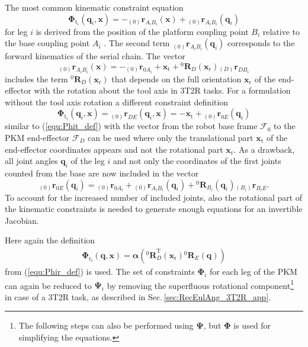 \documentclass[twocolumn,10pt]{IFTOMM}
\newcommand{\bm}[1]{\boldsymbol{#1}}
\newcommand{\ortvek}[4]{{ }_{(#1)}{\boldsymbol{#2}}^{#3}_{#4} }
\newcommand{\rotmat}[2]{{{ }^{#1}\boldsymbol{R}}_{#2}}
\newcommand{\transp}[0]{{\mathrm{T}}}
\newcommand{\ks}[1]{{\mathcal{F}}_{#1}}
\begin{document}
The most common kinematic constraint equation 
%
\begin{equation}
\bm{\Phi}_{\mathrm{t}_i}(\bm{q}_i,\bm{x}) = - \ortvek{0}{r}{}{A_iB_i}(\bm{x}) + \ortvek{0}{r}{}{A_iB_i}(\bm{q}_i) 
\end{equation}
%
for leg $i$ is derived from the position of the platform coupling point $B_i$ relative to the base coupling point $A_i$ \cite{Merlet2006}.
The second term $\ortvek{0}{r}{}{A_iB_i}(\bm{q}_i)$ corresponds to the forward kinematics of the serial chain. 
The vector
\begin{equation}
\ortvek{0}{r}{}{A_iB_i}(\bm{x}) = 
- \ortvek{0}{r}{}{0A_i}
+ \bm{x}_{\mathrm{t}} + \rotmat{0}{D}(\bm{x}_{\mathrm{r}}) \ortvek{D}{r}{}{DB_i}
\end{equation}
%
includes the term $\rotmat{0}{D}(\bm{x}_{\mathrm{r}})$ that depends on the full  orientation $\bm{x}_{\mathrm{r}}$ of the end-effector with the rotation about the tool axis in 3T2R tasks.
For a formulation without the tool axis rotation a different constraint definition
%
\begin{equation}
\bm{\Phi}_{\mathrm{t}_i}(\bm{q}_i,\bm{x}) = 
\ortvek{0}{r}{}{DE}(\bm{q}_i,\bm{x}) =
- \bm{x}_{\mathrm{t}} + \ortvek{0}{r}{}{0E}(\bm{q}_i) 
\end{equation}
%
similar to (\ref{equ:Phit_def}) with the vector from the robot base frame $\ks{0}$ to the PKM end-effector $\ks{D}$ can be used where 
only the translational part $\bm{x}_{\mathrm{t}}$ of the end-effector coordinates appears and not the rotational part $\bm{x}_{\mathrm{r}}$.
As a drawback, all joint angles $\bm{q}_i$ of the leg $i$ and not only the coordinates of the first joints counted from the base are now included
in the vector
%
\begin{equation}
\ortvek{0}{r}{}{0E}(\bm{q}_i) = 
\ortvek{0}{r}{}{0A_i}
+ \ortvek{0}{r}{}{A_iB_i}(\bm{q}_i) + \rotmat{0}{B_i}(\bm{q}_i) \ortvek{B_i}{r}{}{B_iE}.
\end{equation}
%
To account for the increased number of included joints, also the rotational part of the kinematic constraints is needed to generate enough equations for an invertible Jacobian.

Here again the definition 
%
\begin{align}
\bm{\Phi}_{\mathrm{r}_i}(\bm{q},\bm{x})
=\bm{\alpha}\left(\rotmat{0}{D}^\transp (\bm{x}_{\mathrm{r}})\rotmat{0}{E}(\bm{q})\right)
\end{align}
%
from (\ref{equ:Phir_def}) is used.
The set of constraints $\bm{\Phi}_{i}$ for each leg of the PKM can again be reduced to $\bm{\Psi}_{i}$ by removing the superfluous rotational component\footnote{The following steps can also be performed using $\bm{\Psi}$, but $\bm{\Phi}$ is used for simplifying the equations.} in case of a 3T2R task, as described in Sec.\,\ref{sec:RecEulAng_3T2R_app}.
\end{document}
